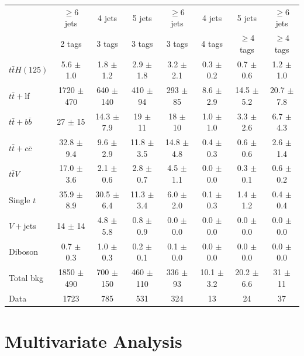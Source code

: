 \begin{table}
\begin{adjustwidth}{-1.7in}{-1.7in}
\begin{tabular}{|l|c|c|c|c|c|c|c|}
& $\geq$6 jets & 4 jets & 5 jets & $\geq$6 jets & 4 jets & 5 jets & $\geq$6 jets \\
& 2 tags & 3 tags & 3 tags & 3 tags & 4 tags & $\geq$4 tags & $\geq$4 tags \\ \hline \hline
$t\bar{t}H(125)$ & 5.6 $\pm$ 1.0 & 1.8 $\pm$ 1.2 & 2.9 $\pm$ 1.8 & 3.2 $\pm$ 2.1 & 0.3 $\pm$ 0.2 & 0.7 $\pm$ 0.6 & 1.2 $\pm$ 1.0 \\
 \hline
$t\bar{t}+$lf & 1720 $\pm$ 470 & 640 $\pm$ 140 & 410 $\pm$ 94 & 293 $\pm$ 85 & 8.6 $\pm$ 2.9 & 14.5 $\pm$ 5.2 & 20.7 $\pm$ 7.8 \\
$t\bar{t}+b\bar{b}$ & 27 $\pm$ 15 & 14.3 $\pm$ 7.9 & 19 $\pm$ 11 & 18 $\pm$ 10 & 1.0 $\pm$ 1.0 & 3.3 $\pm$ 2.6 & 6.7 $\pm$ 4.3 \\
$t\bar{t}+c\bar{c}$ & 32.8 $\pm$ 9.4 & 9.6 $\pm$ 2.9 & 11.8 $\pm$ 3.5 & 14.8 $\pm$ 4.8 & 0.4 $\pm$ 0.3 & 0.6 $\pm$ 0.6 & 2.6 $\pm$ 1.4 \\
$t\bar{t}V$ & 17.0 $\pm$ 3.6 & 2.1 $\pm$ 0.6 & 2.8 $\pm$ 0.7 & 4.5 $\pm$ 1.1 & 0.0 $\pm$ 0.0 & 0.3 $\pm$ 0.1 & 0.6 $\pm$ 0.2 \\
Single $t$ & 35.9 $\pm$ 8.9 & 30.5 $\pm$ 6.4 & 11.3 $\pm$ 3.4 & 6.0 $\pm$ 2.0 & 0.1 $\pm$ 0.3 & 1.4 $\pm$ 1.2 & 0.4 $\pm$ 0.4 \\
$V+$jets & 14 $\pm$ 14 & 4.8 $\pm$ 5.8 & 0.8 $\pm$ 0.9 & 0.0 $\pm$ 0.0 & 0.0 $\pm$ 0.0 & 0.0 $\pm$ 0.0 & 0.0 $\pm$ 0.0 \\
Diboson & 0.7 $\pm$ 0.3 & 1.0 $\pm$ 0.3 & 0.2 $\pm$ 0.1 & 0.1 $\pm$ 0.0 & 0.0 $\pm$ 0.0 & 0.0 $\pm$ 0.0 & 0.0 $\pm$ 0.0 \\
 \hline
Total bkg & 1850 $\pm$ 490 & 700 $\pm$ 150 & 460 $\pm$ 110 & 336 $\pm$ 93 & 10.1 $\pm$ 3.2 & 20.2 $\pm$ 6.6 & 31 $\pm$ 11 \\
 \hline
Data & 1723 & 785 & 531 & 324 & 13 & 24 & 37 \\
\hline
\end{tabular}
  \end{adjustwidth}
\end{table}



\section{Multivariate Analysis}
\label{mva_overview}

